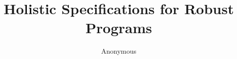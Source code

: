 \documentclass[runningheads]{llncs}
\begin{document}
\title{Holistic Specifications for Robust Programs}

\author{Anonymous}


%
%
%

\maketitle
\end{document}
